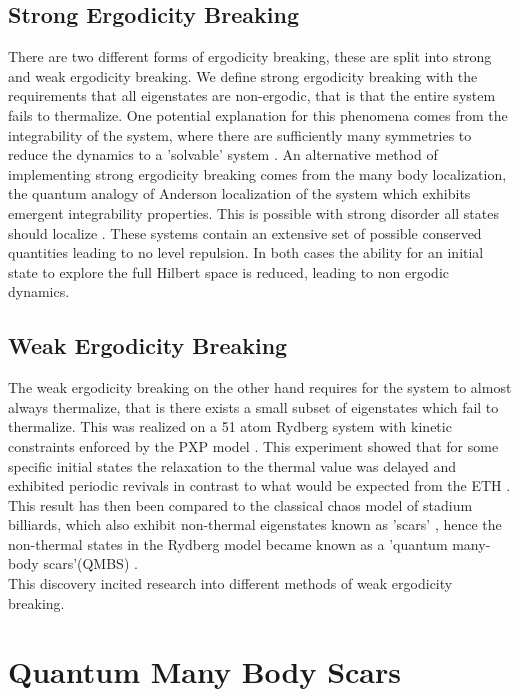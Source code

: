 \subsection{Strong Ergodicity Breaking}
There are two different forms of ergodicity breaking, these are split into strong and weak ergodicity breaking. We define strong ergodicity breaking with the requirements that all eigenstates are non-ergodic, that is that the entire system fails to thermalize. One potential explanation for this phenomena comes from the integrability of the system, where there are sufficiently many symmetries to reduce the dynamics to a 'solvable' system \citep{kinoshita_quantum_2006}. An alternative method of implementing strong ergodicity breaking comes from the many body localization, the quantum analogy of Anderson localization of the system which exhibits emergent integrability properties. This is possible with strong disorder all states should localize \citep{Guan_AndersonLocalization}. These systems contain an extensive set of possible conserved quantities leading to no level repulsion. In both cases the ability for an initial state to explore the full Hilbert space is reduced, leading to non ergodic dynamics.\citep{ALET_MBLrev} 
\subsection{Weak Ergodicity Breaking}
The weak ergodicity breaking on the other hand requires for the system to almost always thermalize, that is there exists a small subset of eigenstates which fail to thermalize. This was realized on a 51 atom Rydberg system with kinetic constraints enforced by the PXP model \citep{bernien_probing_2017}. This experiment showed that for some specific initial states the relaxation to the thermal value was delayed and exhibited periodic revivals in contrast to what would be expected from the ETH . This result has then been compared to the classical chaos model of stadium billiards, which also exhibit non-thermal eigenstates known as 'scars' \cite{heller_bound-state_1984}, hence the non-thermal states in the Rydberg model became known as a 'quantum many-body scars'(QMBS) \cite{turner_quantum_2018}. \citep{keski-rahkonen_controllable_2017}
\\
This discovery incited research into different methods of weak ergodicity breaking.\cite{serbyn_quantum_2021}\\ 
\section{Quantum Many Body Scars}

